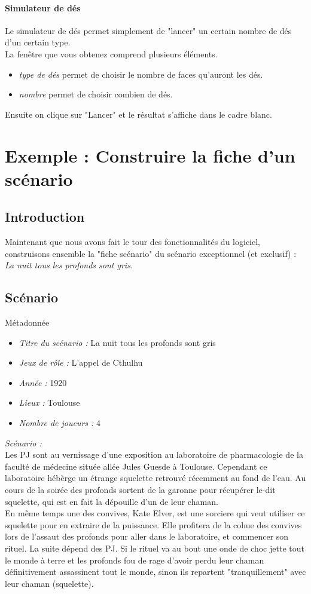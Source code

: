 \documentclass[a4paper,12pt]{article}
\begin{document}
\paragraph{Simulateur de dés}
Le simulateur de dés permet simplement de "lancer" un certain nombre de dés d'un certain type.
\\
La fenêtre que vous obtenez comprend plusieurs éléments.
\begin{itemize}
  \item  \emph{type de dés} permet de choisir le nombre de faces qu'auront les dés.
  \item \emph{nombre} permet de choisir combien de dés.
\end{itemize}
Ensuite on clique sur "Lancer" et le résultat s'affiche dans le cadre blanc.

\section{Exemple : Construire la fiche d'un scénario}
\subsection{Introduction}
Maintenant que nous avons fait le tour des fonctionnalités du logiciel, construisons ensemble la "fiche scénario" du scénario exceptionnel (et exclusif) : \emph{La nuit tous les profonds sont gris}.

\subsection{Scénario}
\label{exemple_scenario}
Métadonnée
\begin{itemize}
    \item \emph{Titre du scénario :} La nuit tous les profonds sont gris
    \item \emph{Jeux de rôle :} L'appel de Cthulhu
    \item \emph{Année :} 1920
    \item \emph{Lieux :} Toulouse
    \item \emph{Nombre de joueurs : } 4
\end{itemize}

\emph{Scénario :}\\ 
Les PJ sont au vernissage d'une exposition au laboratoire de pharmacologie de la faculté de médecine située allée Jules Guesde à Toulouse. Cependant ce laboratoire hébèrge  un étrange squelette retrouvé récemment au fond de l'eau. Au cours de la soirée des profonds sortent de la garonne pour récupérer le-dit squelette, qui est en fait la dépouille d'un de leur chaman.
\\
En même temps une des convives, Kate Elver, est une sorciere qui veut utiliser ce squelette pour en extraire de la puissance. Elle profitera de la cohue des convives lors de l'assaut des profonds pour aller dans le laboratoire, et commencer son rituel. La suite dépend des PJ. Si le rituel va au bout une onde de choc jette tout le monde à terre et les profonds fou de rage d'avoir perdu leur chaman définitivement assassinent tout le monde, sinon ils repartent "tranquillement" avec leur chaman (squelette).
\end{document}
